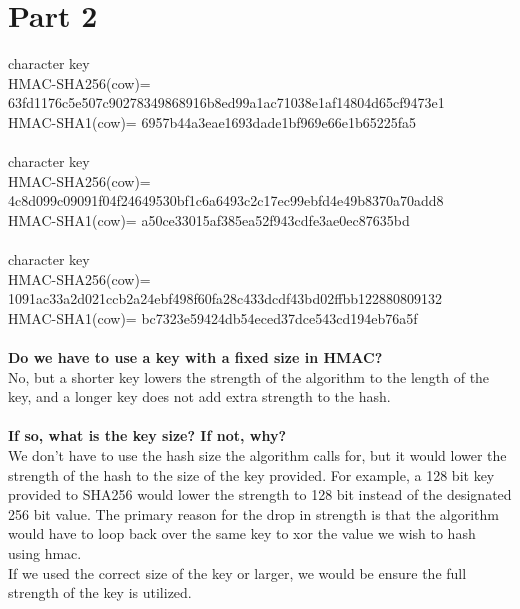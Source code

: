 \documentclass[10pt,letterpaper]{article}
\begin{document}
\section*{Part 2}
 character key\\
\noindent HMAC-SHA256(cow)= 63fd1176c5e507c90278349868916b8ed99a1ac71038e1af14804d65cf9473e1\\
\noindent HMAC-SHA1(cow)= 6957b44a3eae1693dade1bf969e66e1b65225fa5\\\\

 character key\\
\noindent HMAC-SHA256(cow)= 4c8d099c09091f04f24649530bf1c6a6493c2c17ec99ebfd4e49b8370a70add8\\
\noindent HMAC-SHA1(cow)= a50ce33015af385ea52f943cdfe3ae0ec87635bd\\\\

 character key\\
\noindent HMAC-SHA256(cow)= 1091ac33a2d021ccb2a24ebf498f60fa28c433dcdf43bd02ffbb122880809132\\
\noindent HMAC-SHA1(cow)= bc7323e59424db54eced37dce543cd194eb76a5f\\\\

\noindent \textbf{Do we have to use a key with a fixed size in HMAC?}\\

\noindent No, but a shorter key lowers the strength of the algorithm to the length of the
key, and a longer key does not add extra strength to the hash.\\\\ 


\noindent \textbf{If so, what is the key size? If not, why?}\\

\noindent We don't have to use the hash size the algorithm calls for, but it would lower
the strength of the hash to the size of the key provided. For example, a 128
bit key provided to SHA256 would lower the strength to 128 bit instead of the
designated 256 bit value. The primary reason for the drop in strength is that
the algorithm would have to loop back over the same key to xor the value we
wish to hash using hmac.\\

\noindent If we used the correct size of the key or larger, we would be ensure the full
strength of the key is utilized. 
\end{document}
